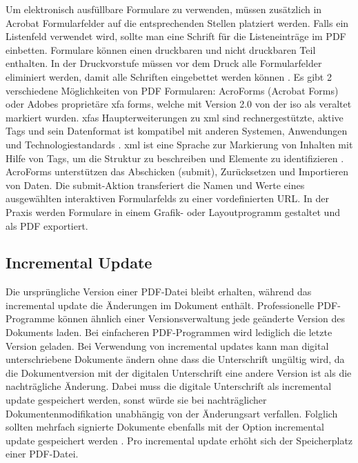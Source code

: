 Um elektronisch ausfüllbare Formulare zu verwenden, müssen zusätzlich in Acrobat Formularfelder auf die entsprechenden Stellen platziert werden. Falls ein Listenfeld verwendet wird, sollte man eine Schrift für die Listeneinträge im PDF einbetten. Formulare können einen druckbaren und nicht druckbaren Teil enthalten. In der Druckvorstufe müssen vor dem Druck alle Formularfelder eliminiert werden, damit alle Schriften eingebettet werden können \cite{schneeberger}. Es gibt 2 verschiedene Möglichkeiten von PDF Formularen: AcroForms (Acrobat Forms) oder Adobes proprietäre \gls{xfa} forms, welche mit Version 2.0 von der \gls{iso} als veraltet markiert wurden. \gls{xfa}s Haupterweiterungen zu \gls{xml} sind rechnergestützte, aktive Tags und sein Datenformat ist kompatibel mit anderen Systemen, Anwendungen und Technologiestandards \cite{wiki-xfa}. \gls{xml} ist eine Sprache zur Markierung von Inhalten mit Hilfe von Tags, um die Struktur zu beschreiben und Elemente zu identifizieren \cite{schneeberger}. AcroForms unterstützen das Abschicken (submit), Zurücksetzen und Importieren von Daten. Die submit-Aktion transferiert die Namen und Werte eines ausgewählten interaktiven Formularfelds zu einer vordefinierten URL. In der Praxis werden Formulare in einem Grafik- oder Layoutprogramm gestaltet und als PDF exportiert.

\subsection{Incremental Update}
Die ursprüngliche Version einer PDF-Datei bleibt erhalten, während das incremental update die Änderungen im Dokument enthält. Professionelle PDF-Programme können ähnlich einer Versionsverwaltung jede geänderte Version des Dokuments laden. Bei einfacheren PDF-Programmen wird lediglich die letzte Version geladen. Bei Verwendung von incremental updates kann man digital unterschriebene Dokumente ändern ohne dass die Unterschrift ungültig wird, da die Dokumentversion mit der digitalen Unterschrift eine andere Version ist als die nachträgliche Änderung. Dabei muss die digitale Unterschrift als incremental update gespeichert werden, sonst würde sie bei nachträglicher Dokumentenmodifikation unabhängig von der Änderungsart verfallen. Folglich sollten mehrfach signierte Dokumente ebenfalls mit der Option incremental update gespeichert werden \cite{softx}. Pro incremental update erhöht sich der Speicherplatz einer PDF-Datei.

